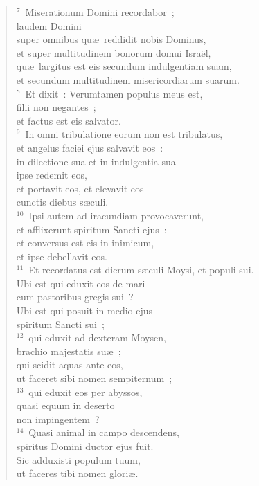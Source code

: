 \begin{flushleft}\begin{verse}${}^{7}$~Miserationum Domini recordabor~;\\ laudem Domini\\ super omnibus qu\ae\ reddidit nobis Dominus,\\ et super multitudinem bonorum domui Isra\"el,\\ qu\ae\ largitus est eis secundum indulgentiam suam,\\ et secundum multitudinem misericordiarum suarum.\\
${}^{8}$~Et dixit~: Verumtamen populus meus est,\\ filii non negantes~;\\ et factus est eis salvator.\\
${}^{9}$~In omni tribulatione eorum non est tribulatus,\\ et angelus faciei ejus salvavit eos~:\\ in dilectione sua et in indulgentia sua\\ ipse redemit eos,\\ et portavit eos, et elevavit eos\\ cunctis diebus s\ae culi.\\
${}^{10}$~Ipsi autem ad iracundiam provocaverunt,\\ et afflixerunt spiritum Sancti ejus~:\\ et conversus est eis in inimicum,\\ et ipse debellavit eos.\\
${}^{11}$~Et recordatus est dierum s\ae culi Moysi, et populi sui.\\ Ubi est qui eduxit eos de mari\\ cum pastoribus gregis sui~?\\ Ubi est qui posuit in medio ejus\\ spiritum Sancti sui~;\\
${}^{12}$~qui eduxit ad dexteram Moysen,\\ brachio majestatis su\ae~;\\ qui scidit aquas ante eos,\\ ut faceret sibi nomen sempiternum~;\\
${}^{13}$~qui eduxit eos per abyssos,\\ quasi equum in deserto\\ non impingentem~?\\
${}^{14}$~Quasi animal in campo descendens,\\ spiritus Domini ductor ejus fuit.\\ Sic adduxisti populum tuum,\\ ut faceres tibi nomen glori\ae .\\

\end{verse}
\end{flushleft}
